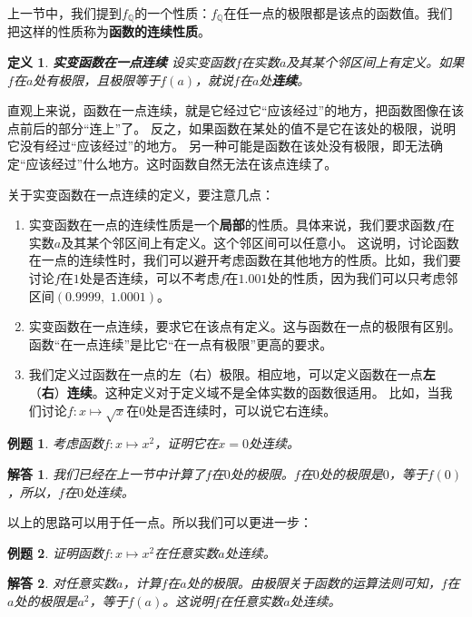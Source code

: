 \documentclass[12pt,UTF8]{ctexbook}
\newtheorem{df}{定义}[section]
\newtheorem{et}{例题}[section]
\newtheorem*{so}{解答}
\begin{document}
上一节中，我们提到$f_{\mathbb{Q}}$的一个性质：$f_{\mathbb{Q}}$在任一点的极限都是该点的函数值。我们把这样的性质称为\textbf{函数的连续性质}。

\begin{df}{\textbf{实变函数在一点连续}}
    设实变函数$f$在实数$a$及其某个邻区间上有定义。如果$f$在$a$处有极限，且极限等于$f(a)$，就说$f$在$a$处\textbf{连续}。
\end{df}

直观上来说，函数在一点连续，就是它经过它“应该经过”的地方，把函数图像在该点前后的部分“连上”了。
反之，如果函数在某处的值不是它在该处的极限，说明它没有经过“应该经过”的地方。
另一种可能是函数在该处没有极限，即无法确定“应该经过”什么地方。这时函数自然无法在该点连续了。

关于实变函数在一点连续的定义，要注意几点：
\begin{enumerate}
    \item 实变函数在一点的连续性质是一个\textbf{局部}的性质。具体来说，我们要求函数$f$在实数$a$及其某个邻区间上有定义。这个邻区间可以任意小。
    这说明，讨论函数在一点的连续性时，我们可以避开考虑函数在其他地方的性质。比如，我们要讨论$f$在$1$处是否连续，可以不考虑$f$在$1.001$处的性质，因为我们可以只考虑邻区间$(0.9999,\,\,1.0001)$。
    \item 实变函数在一点连续，要求它在该点有定义。这与函数在一点的极限有区别。函数“在一点连续”是比它“在一点有极限”更高的要求。
    \item 我们定义过函数在一点的左（右）极限。相应地，可以定义函数在一点\textbf{左}（\textbf{右}）\textbf{连续}。这种定义对于定义域不是全体实数的函数很适用。
    比如，当我们讨论$f:x\mapsto \sqrt{x}$在$0$处是否连续时，可以说它右连续。
\end{enumerate}

\begin{et}
    考虑函数$f:x\mapsto x^2$，证明它在$x=0$处连续。
\end{et}
\begin{so}
    我们已经在上一节中计算了$f$在$0$处的极限。$f$在$0$处的极限是$0$，等于$f(0)$，所以，$f$在$0$处连续。
\end{so}

以上的思路可以用于任一点。所以我们可以更进一步：
\begin{et}
    证明函数$f:x\mapsto x^2$在任意实数$a$处连续。
\end{et}
\begin{so}
    对任意实数$a$，计算$f$在$a$处的极限。由极限关于函数的运算法则可知，$f$在$a$处的极限是$a^2$，等于$f(a)$。这说明$f$在任意实数$a$处连续。
\end{so}
\end{document}

